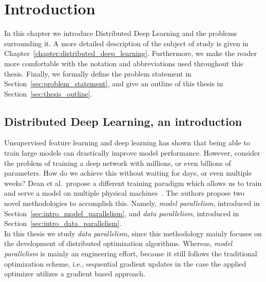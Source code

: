 %
%
%

\chapter{Introduction}
\label{chapter:introduction}

In this chapter we introduce Distributed Deep Learning and the problems surrounding it. A more detailed description of the subject of study is given in Chapter~\ref{chapter:distributed_deep_learning}. Furthermore, we make the reader more comfortable with the notation and abbreviations used throughout this thesis. Finally, we formally define the problem statement in Section~\ref{sec:problem_statement}, and give an outline of this thesis in Section~\ref{sec:thesis_outline}.

\section[Distributed Deep Learning]{Distributed Deep Learning, an introduction}
\label{sec:intro_distributed_deep_learning}

Unsupervised feature learning and deep learning has shown that being able to train large models can drastically improve model performance. However, consider the problem of training a deep network with millions, or even billions of parameters. How do we achieve this without waiting for days, or even multiple weeks? Dean et al.~propose a different training paradigm which allows us to train and serve a model on multiple physical machines~\cite{dean2012large}. The authors propose two novel methodologies to accomplish this. Namely, \emph{model parallelism}, introduced in Section~\ref{sec:intro_model_parallelism}, and \emph{data parallelism}, introduced in Section~\ref{sec:intro_data_parallelism}.\\

In this thesis we study \emph{data parallelism}, since this methodology mainly focuses on the development of distributed optimization algorithms. Whereas, \emph{model parallelism} is mainly an engineering effort, because it still follows the traditional optimization scheme, i.e., sequential gradient updates in the case the applied optimizer utilizes a gradient based approach.

